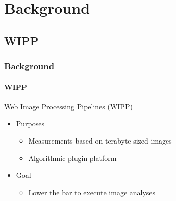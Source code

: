 \def\sectiontitle{Background}

\section{\sectiontitle}

\def\slidetitle{WIPP}

\subsection{\slidetitle}
\begin{frame}
  \frametitle{\sectiontitle}
  \framesubtitle{\slidetitle}

  \begin{minipage}[h!]{0.60\textwidth}
    Web Image Processing Pipelines (WIPP)
    \begin{itemize}
      \item Purposes
      \begin{itemize}
        \item Measurements based on terabyte-sized images
        \item Algorithmic plugin platform
      \end{itemize}
      \item Goal
      \begin{itemize}
        \item Lower the bar to execute image analyses
      \end{itemize}
    \end{itemize}
  \end{minipage}\hfill
  \begin{minipage}[h!]{0.35\textwidth}

\end{minipage}
\end{frame}
